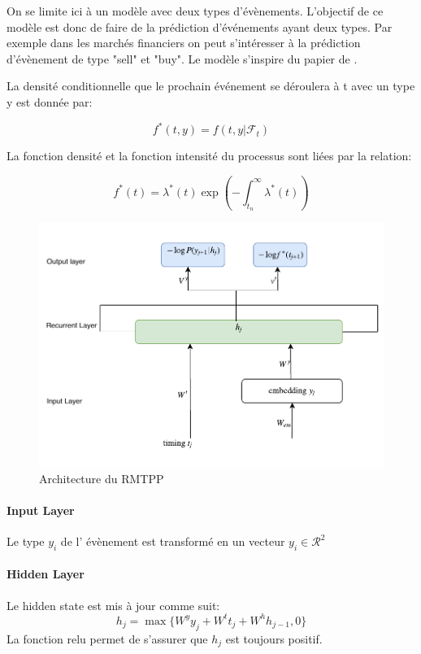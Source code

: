\documentclass[../main.tex]{subfiles}
\begin{document}
On se limite ici à un modèle avec deux types d'évènements. L'objectif de ce modèle est donc de faire de la prédiction d'événements ayant deux types. Par exemple dans les marchés financiers on peut s'intéresser à la prédiction  d'évènement de type "sell" et "buy".  Le modèle s'inspire du papier de \citeauthor{DuRMTPP} \cite{DuRMTPP}.{\tiny {\tiny }}

La densité conditionnelle que le prochain événement se déroulera à t avec un type y est donnée par:

\begin{equation}
f^*(t,y) = f(t,y| \mathcal{F}_t)
\end{equation}

La fonction densité et la fonction intensité du processus sont liées par la relation:

\begin{equation}
f^*(t) = \lambda^*(t) \exp(-\int_{t_n}^{\infty}  \lambda^*(t) )
\end{equation}


\begin{figure}[!ht]
	\centering
	\includegraphics[width=\linewidth]{diagrams/rmtpp.pdf}
	\caption{Architecture du RMTPP}\label{fig:RMTPP}
\end{figure}


\paragraph{Input Layer}

Le type $y_{i}$  de l' évènement est transformé en un vecteur $y_{i } \in \mathcal{R} ^2$


\paragraph{Hidden Layer}
Le hidden state est mis à jour comme suit:
\begin{equation}
h_j = \max \{ W^y y_j + W^t t_j + W^h h_{j-1},0  \}  
\end{equation}
La fonction relu permet de s'assurer que $h_j$ est toujours positif.
\end{document}
